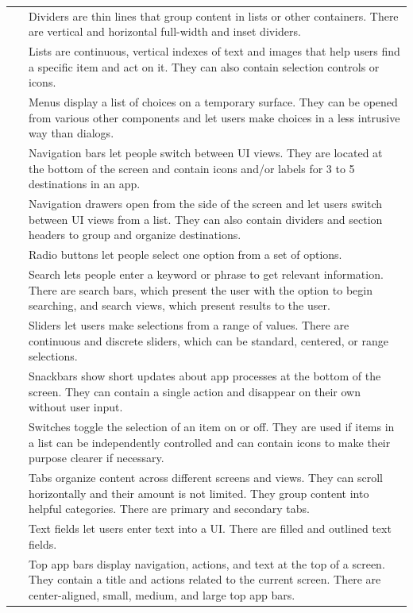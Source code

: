 \documentclass[11pt,titlepage,oneside,openany]{book}
\begin{document}
\begin{longtable}{|p{}|p{}|}
	~ & Dividers are thin lines that group content in lists or other containers. There are vertical and horizontal full-width and inset dividers. \\ 
	~ & Lists are continuous, vertical indexes of text and images that help users find a specific item and act on it. They can also contain selection controls or icons. \\ 
	~ & Menus display a list of choices on a temporary surface. They can be opened from various other components and let users make choices in a less intrusive way than dialogs. \\ 
	~ & Navigation bars let people switch between UI views. They are located at the bottom of the screen and contain icons and/or labels for 3 to 5 destinations in an app. \\ 
	~ & Navigation drawers open from the side of the screen and let users switch between UI views from a list. They can also contain dividers and section headers to group and organize destinations. \\ 
	~ & Radio buttons let people select one option from a set of options. \\ 
	~ & Search lets people enter a keyword or phrase to get relevant information. There are search bars, which present the user with the option to begin searching, and search views, which present results to the user. \\ 
	~ & Sliders let users make selections from a range of values. There are continuous and discrete sliders, which can be standard, centered, or range selections. \\ 
	~ & Snackbars show short updates about app processes at the bottom of the screen. They can contain a single action and disappear on their own without user input. \\ 
	~ & Switches toggle the selection of an item on or off. They are used if items in a list can be independently controlled and can contain icons to make their purpose clearer if necessary. \\ 
	~ & Tabs organize content across different screens and views. They can scroll horizontally and their amount is not limited. They group content into helpful categories. There are primary and secondary tabs. \\ 
	~ & Text fields let users enter text into a UI. There are filled and outlined text fields. \\ 
	~ & Top app bars display navigation, actions, and text at the top of a screen. They contain a title and actions related to the current screen. There are center-aligned, small, medium, and large top app bars. \\ \hline

\end{longtable}
\end{document}
